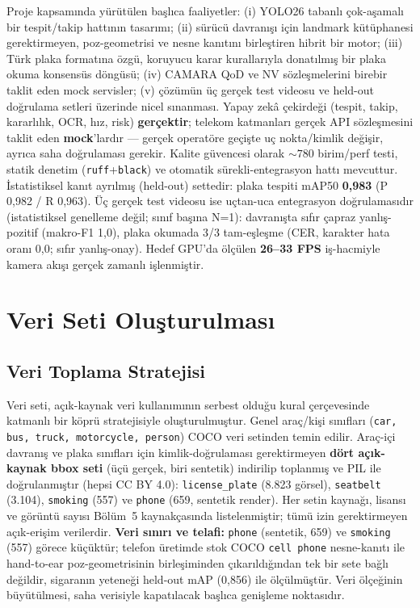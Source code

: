 \documentclass[12pt,a4paper]{article}
\newcommand{\tcode}[1]{\texttt{\small #1}}
\begin{document}
Proje kapsamında yürütülen başlıca faaliyetler: (i) YOLO26 tabanlı çok-aşamalı bir tespit/takip
hattının tasarımı; (ii) sürücü davranışı için landmark kütüphanesi gerektirmeyen, poz-geometrisi
ve nesne kanıtını birleştiren hibrit bir motor; (iii) Türk plaka formatına özgü, koruyucu karar
kurallarıyla donatılmış bir plaka okuma konsensüs döngüsü; (iv) CAMARA QoD ve NV sözleşmelerini
birebir taklit eden mock servisler; (v) çözümün üç gerçek test videosu ve held-out doğrulama
setleri üzerinde nicel sınanması. Yapay zekâ çekirdeği (tespit, takip, kararlılık, OCR, hız,
risk) \textbf{gerçektir}; telekom katmanları gerçek API sözleşmesini taklit eden \textbf{mock}'lardır
— gerçek operatöre geçişte uç nokta/kimlik değişir, ayrıca saha doğrulaması gerekir. Kalite güvencesi
olarak ${\sim}780$ birim/perf testi, statik denetim (\tcode{ruff}+\tcode{black}) ve otomatik
sürekli-entegrasyon hattı mevcuttur. İstatistiksel kanıt ayrılmış (held-out) settedir: plaka tespiti
mAP50 \textbf{0,983} (P 0,982 / R 0,963). Üç gerçek test videosu ise uçtan-uca entegrasyon
doğrulamasıdır (istatistiksel genelleme değil; sınıf başına N=1): davranışta sıfır çapraz yanlış-pozitif
(makro-F1 1,0), plaka okumada 3/3 tam-eşleşme (CER, karakter hata oranı 0,0; sıfır yanlış-onay). Hedef
GPU'da ölçülen \textbf{26--33 FPS} iş-hacmiyle kamera akışı gerçek zamanlı işlenmiştir.

\section{Veri Seti Oluşturulması}

\subsection{Veri Toplama Stratejisi}
Veri seti, açık-kaynak veri kullanımının serbest olduğu kural çerçevesinde katmanlı bir köprü
stratejisiyle oluşturulmuştur. Genel araç/kişi sınıfları (\tcode{car, bus, truck, motorcycle,
person}) COCO veri setinden temin edilir. Araç-içi davranış ve plaka sınıfları için
kimlik-doğrulaması gerektirmeyen \textbf{dört açık-kaynak bbox seti} (üçü gerçek, biri sentetik)
indirilip toplanmış ve PIL ile doğrulanmıştır (hepsi CC BY 4.0): \tcode{license\_plate} (8.823 görsel),
\tcode{seatbelt} (3.104), \tcode{smoking} (557) ve \tcode{phone} (659, sentetik render). Her setin kaynağı, lisansı ve
görüntü sayısı Bölüm~5 kaynakçasında listelenmiştir; tümü izin gerektirmeyen açık-erişim verilerdir.
\textbf{Veri sınırı ve telafi:} \tcode{phone} (sentetik, 659) ve \tcode{smoking} (557) görece
küçüktür; telefon üretimde stok COCO \tcode{cell phone} nesne-kanıtı ile hand-to-ear poz-geometrisinin
birleşiminden çıkarıldığından tek bir sete bağlı değildir, sigaranın yeteneği held-out mAP (0,856) ile
ölçülmüştür. Veri ölçeğinin büyütülmesi, saha verisiyle kapatılacak başlıca genişleme noktasıdır.
\end{document}
